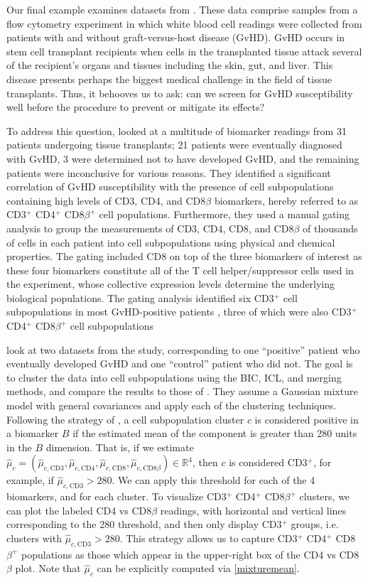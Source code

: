 \documentclass{uwstat572}
\newcommand*\reals{\mathbb{R}}
\newcommand*\estim[1]{\widehat{#1}}
\renewcommand\;{\,}
\begin{document}
Our final example examines datasets from \cite{Brinkman07}.
These data comprise samples from a flow cytometry experiment in which white blood cell readings were collected from patients with and without graft-versus-host disease (GvHD).
GvHD occurs in stem cell transplant recipients when cells in the transplanted tissue attack several of the recipient's organs and tissues including the skin, gut, and liver.
This disease presents perhaps the biggest medical challenge in the field of tissue transplants.
Thus, it behooves us to ask: can we screen for GvHD susceptibility well before the procedure to prevent or mitigate its effects?

To address this question, \cite{Brinkman07} looked at a multitude of biomarker readings from 31 patients undergoing tissue transplants; 21 patients were eventually diagnosed with GvHD, 3 were determined not to have developed GvHD, and the remaining patients were inconclusive for various reasons.
They identified a significant correlation of GvHD susceptibility with the presence of cell subpopulations containing high levels of CD3, CD4, and CD8$\beta$ biomarkers, hereby referred to as CD3$^+$ CD4$^+$ CD8$\beta^+$ cell populations.
Furthermore, they used a manual gating analysis to group the measurements of CD3, CD4, CD8, and CD8$\beta$ of thousands of cells in each patient into cell subpopulations using physical and chemical properties.
The gating included CD8 on top of the three biomarkers of interest as these four biomarkers constitute all of the T cell helper/suppressor cells used in the experiment, whose collective expression levels determine the underlying biological populations.
The gating analysis identified six CD3$^+$ cell subpopulations in most GvHD-positive patients , three of which were also 
CD3$^+$ CD4$^+$ CD8$\beta^+$ cell subpopulations

\cite{Baudry10} look at two datasets from the study, corresponding to one ``positive'' patient who eventually developed GvHD and one ``control'' patient who did not.
The goal is to cluster the data into cell subpopulations using the BIC, ICL, and merging methods, and compare the results to those of \cite{Brinkman07}.
They assume a Gaussian mixture model with general covariances and apply each of the clustering techniques.
Following the strategy of \cite{Lo08}, a cell subpopulation cluster $c$ is considered positive in a biomarker $B$ if the estimated mean of the component is greater than 280 units in the $B$ dimension.
That is, if we estimate $\estim\mu_c = \left(\estim \mu_{c, \text{CD3}}, \estim \mu_{c, \text{CD4}}, \estim\mu_{c, \text{CD8}}, \estim\mu_{c, \text{CD8$\beta$}}\right) \in \reals^4$, then $c$ is considered CD3$^+$, for example, if $\estim\mu_{c, \text{CD3}} > 280$.
We can apply this threshold for each of the 4 biomarkers, and for each cluster.
To visualize CD3$^+$ CD4$^+$ CD8$\beta^+$ clusters, we can plot the labeled CD4 vs CD8$\beta$ readings, with horizontal and vertical lines corresponding to the 280 threshold, and then only display CD3$^+$ groups, i.e. clusters with $\estim\mu_{c, \text{CD3}} > 280$.
This strategy allows us to capture CD3$^+$ CD4$^+$ CD8$\beta^+$ populations as those which appear in the upper-right box of the CD4 vs CD8$\beta$ plot.
Note that $\estim\mu_c$ can be explicitly computed via \eqref{mixturemean}.
\end{document}
